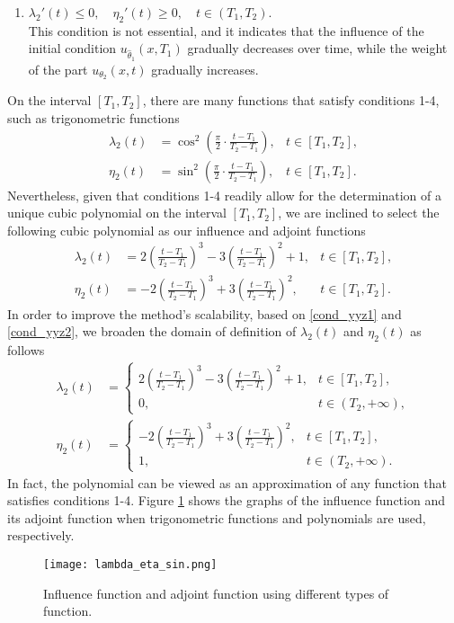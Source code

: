 \documentclass[preprint]{elsarticle}
\numberwithin{table}{section}
\numberwithin{equation}{section}
\numberwithin{figure}{section}
\begin{document}
\begin{CJK}{UTF8}{gbsn}
\begin{enumerate}
    \item $\lambda_2'(t)\le 0 ,\quad \eta_2'(t)\ge 0,\quad t\in(T_1,T_2).$\\
    This condition is not essential,  
    and it indicates that the influence of the initial condition $u_{\hat\theta_1}(x,T_1)$ 
gradually decreases over time, while  the weight of the part $u_{\theta_2}(x,t)$  gradually increases.    
     
\end{enumerate}
On the interval $[T_1,T_2]$, there are many functions that satisfy conditions 1-4, such as trigonometric functions 
\begin{align}\label{eq:cos}
\lambda_{2}(t)  &= \cos^2\left(\frac{\pi}{2} \cdot \frac{t -T_1}{T_2 -T_1}\right), & t \in [T_1, T_2],\\
\eta_{2}(t) &= \sin^2\left(\frac{\pi}{2} \cdot \frac{t -T_1}{T_2 -T_1}\right), & t \in [T_1, T_2].
\end{align}
Nevertheless, given that conditions 1-4 readily allow for the determination of a unique 
 cubic polynomial on the interval $[T_1,T_2]$, we are inclined to select the following cubic polynomial as our influence and adjoint  functions
 \begin{align}\label{eq:lambdaT1T2}
\lambda_{2}(t) &= 
2\left(\frac{t- T_1}{T_2-T_1}\right)^3 - 3\left(\frac{t- T_1}{T_2-T_1}\right)^2+1, & t \in [T_1, T_2], \\
\eta_{2}(t) &= 
-2\left(\frac{t- T_1}{T_2-T_1}\right)^3 + 3\left(\frac{t- T_1}{T_2-T_1}\right)^2, & t \in [T_1, T_2]. 
\end{align}
In order to improve the method's scalability, based on  \eqref{cond_yyz1} and \eqref{cond_yyz2}, we   broaden  the domain of definition of $\lambda_{2}(t)$ and $\eta_{2}(t)$ as follows
\begin{align}\label{eq:lambda}
\lambda_{2}(t) &= 
\begin{cases} 
2\left(\frac{t- T_1}{T_2-T_1}\right)^3 - 3\left(\frac{t- T_1}{T_2-T_1}\right)^2+1, & t \in [T_1, T_2], \\
0, & t \in (T_2, +\infty),
\end{cases}  \\
\eta_{2}(t) &= 
\begin{cases} 
-2\left(\frac{t- T_1}{T_2-T_1}\right)^3 + 3\left(\frac{t- T_1}{T_2-T_1}\right)^2, & t \in [T_1, T_2], \\
1 ,& t \in (T_2, +\infty).
\end{cases} 
\end{align}
{ In fact, the polynomial can be viewed as an approximation of any function that satisfies conditions 1-4.}  Figure \ref{fig:lambda-eta} shows the graphs of the influence function and its adjoint  function when trigonometric functions and polynomials are used, respectively.
\begin{figure}[htbp]
    \centering
\texttt{[image: lambda\_eta\_sin.png]}
\caption{Influence function  and  adjoint  function   using  different types of function.}
\label{fig:lambda-eta}
\end{figure} 


\end{CJK}
\end{document}
